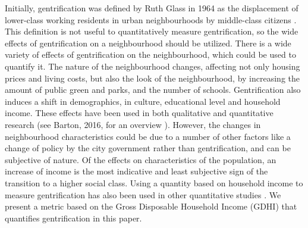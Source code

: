 \documentclass[a4paper, 10pt]{IEEEconf}      %
\begin{document}
Initially, gentrification was defined by Ruth Glass in 1964 as the displacement of lower-class
working residents in urban neighbourhoods by middle-class citizens \cite{gentr_def}. This definition
is not useful to quantitatively measure gentrification, so the wide effects of gentrification on a neighbourhood should be utilized.
There is a wide variety of effects of gentrification on the neighbourhood, which could be used
to quantify it. The nature of the neighbourhood changes, affecting not only housing prices and
living costs, but also the look of the neighbourhood, by increasing the amount of public green
and parks, and the number of schools. Gentrification also induces a shift in demographics, in
culture, educational level and household income. These effects have been used in both qualitative
and quantitative research (see Barton, 2016, for an overview \cite{Barton}). However, the changes
in neighbourhood characteristics could be due to a number of other factors like a change of policy
by the city government rather than gentrification, and can be subjective of nature. Of the effects
on characteristics of the population, an increase of income is the most indicative and least 
subjective sign of the transition to a higher social class. Using a quantity based on household
income to measure gentrification has also been used in other quantitative studies \cite{gentr_research}.
We present a metric based on the Gross Disposable Household Income (GDHI) that quantifies gentrification
in this paper.

\end{document}
